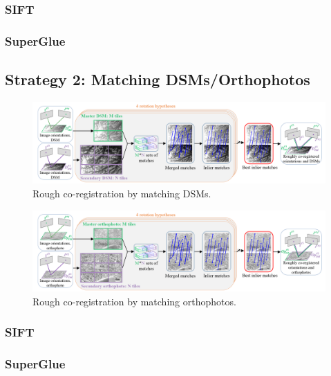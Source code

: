 \subsubsection{SIFT}
\subsubsection{SuperGlue}
\subsection{Strategy 2: Matching DSMs/Orthophotos}
\begin{figure}[htbp]
	\begin{center}
		\includegraphics[width=1\columnwidth]{images/Chapitre3/dsm.png}
		\caption{Rough co-registration by matching DSMs.}
		\label{Flow-process diagram}
	\end{center}
\end{figure}

\begin{figure}[htbp]
	\begin{center}
		\includegraphics[width=1\columnwidth]{images/Chapitre3/ortho.png}
		\caption{Rough co-registration by matching orthophotos.}
		\label{Flow-process diagram}
	\end{center}
\end{figure}

\subsubsection{SIFT}
\subsubsection{SuperGlue}

